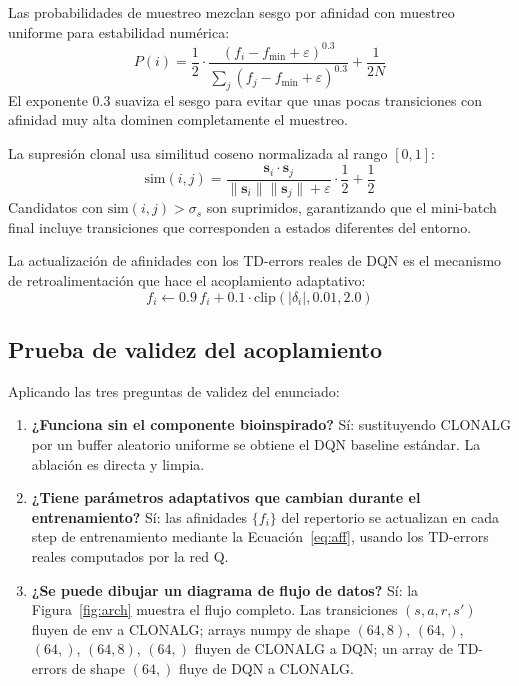 \documentclass[12pt,a4paper]{article}
\begin{document}
Las probabilidades de muestreo mezclan sesgo por afinidad con muestreo
uniforme para estabilidad numérica:
\begin{equation}
  P(i) = \frac{1}{2} \cdot \frac{(f_i - f_{\min} + \varepsilon)^{0.3}}
         {\sum_j (f_j - f_{\min} + \varepsilon)^{0.3}}
       + \frac{1}{2N}
  \label{eq:probs}
\end{equation}
El exponente $0.3$ suaviza el sesgo para evitar que unas pocas transiciones
con afinidad muy alta dominen completamente el muestreo.
 
La supresión clonal usa similitud coseno normalizada al rango $[0,1]$:
\begin{equation}
  \text{sim}(i,j) = \frac{\mathbf{s}_i \cdot \mathbf{s}_j}
    {\|\mathbf{s}_i\|\|\mathbf{s}_j\| + \varepsilon} \cdot \frac{1}{2}
    + \frac{1}{2}
  \label{eq:sim}
\end{equation}
Candidatos con $\text{sim}(i,j) > \sigma_s$ son suprimidos, garantizando
que el mini-batch final incluye transiciones que corresponden a estados
diferentes del entorno.
 
La actualización de afinidades con los TD-errors reales de DQN es el
mecanismo de retroalimentación que hace el acoplamiento adaptativo:
\begin{equation}
  f_i \leftarrow 0.9\, f_i + 0.1 \cdot \text{clip}(|\delta_i|, 0.01, 2.0)
  \label{eq:aff}
\end{equation}
 
\subsection{Prueba de validez del acoplamiento}
 
Aplicando las tres preguntas de validez del enunciado:
 
\begin{enumerate}
  \item \textbf{¿Funciona sin el componente bioinspirado?} Sí: sustituyendo
        CLONALG por un buffer aleatorio uniforme se obtiene el DQN baseline
        estándar. La ablación es directa y limpia.
  \item \textbf{¿Tiene parámetros adaptativos que cambian durante el
        entrenamiento?} Sí: las afinidades $\{f_i\}$ del repertorio se
        actualizan en cada step de entrenamiento mediante la
        Ecuación~\ref{eq:aff}, usando los TD-errors reales computados por
        la red Q.
  \item \textbf{¿Se puede dibujar un diagrama de flujo de datos?} Sí:
        la Figura~\ref{fig:arch} muestra el flujo completo. Las transiciones
        $(s, a, r, s')$ fluyen de env a CLONALG; arrays numpy de shape
        $(64, 8)$, $(64,)$, $(64,)$, $(64, 8)$, $(64,)$ fluyen de CLONALG
        a DQN; un array de TD-errors de shape $(64,)$ fluye de DQN a CLONALG.
\end{enumerate}
 
\end{document}
